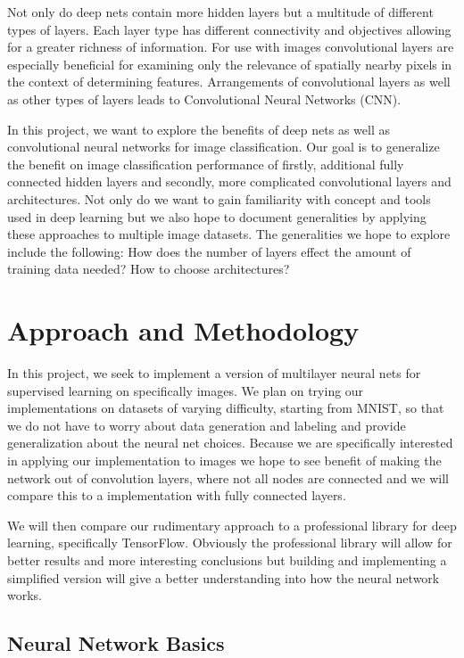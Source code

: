 \documentclass[12pt, twocolumn]{article}
\begin{document}
Not only do deep nets contain more hidden layers but a multitude of different types of layers. Each layer type has different connectivity and objectives allowing for a greater richness of information. For use with images convolutional layers are especially beneficial for examining only the relevance of spatially nearby pixels in the context of determining features. Arrangements of convolutional layers as well as other types of layers leads to Convolutional Neural Networks (CNN). 

In this project, we want to explore the benefits of deep nets as well as convolutional neural networks for image classification.  Our goal is to generalize the benefit on image classification performance of firstly, additional fully connected hidden layers and secondly, more complicated convolutional layers and architectures. Not only do we want to gain familiarity with concept and tools used in deep learning but we also hope to document generalities by applying these approaches to multiple image datasets. The generalities we hope to explore include the following: How does the number of layers effect the amount of training data needed? How to choose architectures? 

\section{Approach and Methodology}
	
In this project, we seek to implement a version of multilayer neural nets for supervised learning on specifically images. We plan on trying our implementations on datasets of varying difficulty, starting from MNIST, so that we do not have to worry about data generation and labeling and provide generalization about the neural net choices. Because we are specifically interested in applying our implementation to images we hope to see benefit of making the network out of convolution layers, where not all nodes are connected and we will compare this to a implementation with fully connected layers.

 We will then compare our rudimentary approach to a professional library for deep learning, specifically TensorFlow. Obviously the professional library will allow for better results and more interesting conclusions but building and implementing a simplified version will give a better understanding into how the neural network works. 

\subsection{Neural Network Basics}
\end{document}

